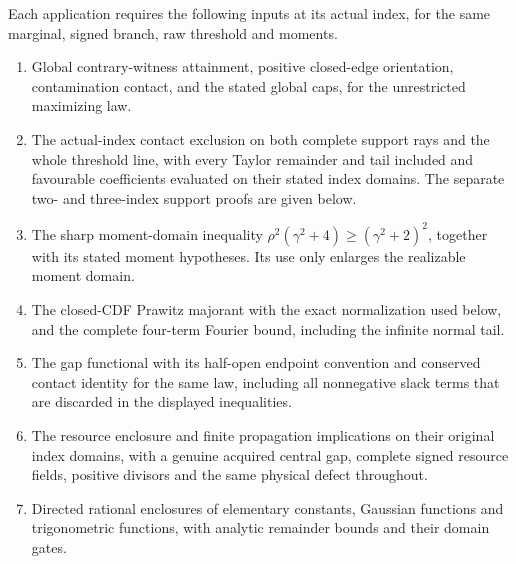 \begin{assumption}
\label{ms:finite:inputs}
Each application requires the following inputs at its actual index, for the
same marginal, signed branch, raw threshold and moments.
\begin{enumerate}
\item\label{ms:finite:input:cut49:global:attainment}
\label{ms:finite:input:cut49:global:contact}
\label{ms:finite:input:cut49:global:finitecaps}
Global contrary-witness attainment, positive closed-edge orientation,
contamination contact, and the stated global caps, for the unrestricted
maximizing law.
\item\label{ms:finite:input:cut49:support:theorem}
The actual-index contact exclusion on both complete support rays and the
whole threshold line, with every Taylor remainder and tail included and
favourable coefficients evaluated on their stated index domains. The separate
two- and three-index support proofs are given below.
\item\label{ms:finite:input:orig:thm:defect}
The sharp moment-domain inequality
$\rho^2(\gamma^2+4)\ge(\gamma^2+2)^2$, together with its stated moment
hypotheses. Its use only enlarges the realizable moment domain.
\item\label{ms:finite:input:orig:lem:BPcardinal}
\label{ms:finite:input:afcore:eq:prawitz}
\label{ms:finite:input:afcore:sec:fourier}
The closed-CDF Prawitz majorant with the exact normalization used below,
and the complete four-term Fourier bound, including the infinite normal tail.
\item\label{ms:finite:input:afcore:eq:gap-definitions}
\label{ms:finite:input:afcore:prop:conserved}
\label{ms:finite:input:afcore:sec:conserved}
The gap functional with its half-open endpoint convention and conserved
contact identity for the same law, including all nonnegative slack terms
that are discarded in the displayed inequalities.
\item\label{ms:finite:input:rescore:re-enclosure}
\label{ms:finite:input:rescore:sec:setup}
\label{ms:finite:input:rescore:u-contract}
\label{ms:finite:input:rescore:u-three-uses}
\label{ms:finite:input:rescore:u-phase-interface}
The resource enclosure and finite propagation implications on their original
index domains, with a genuine acquired central gap, complete signed resource
fields, positive divisors and the same physical defect throughout.
\item\label{ms:finite:input:cut49:short:arithmetic}
\label{ms:finite:input:elementary:section}
Directed rational enclosures of elementary constants, Gaussian functions and
trigonometric functions, with analytic remainder bounds and their domain gates.
\end{enumerate}
\end{assumption}
